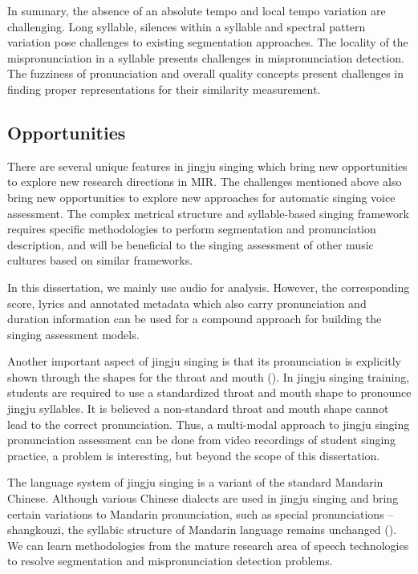 In summary, the absence of an absolute tempo and local tempo variation are challenging. Long syllable, silences within a syllable and spectral pattern variation pose challenges to existing segmentation approaches. The locality of the mispronunciation in a syllable presents challenges in mispronunciation detection. The fuzziness of pronunciation and overall quality concepts present challenges in finding proper representations for their similarity measurement.

\subsection{Opportunities}

There are several unique features in jingju singing which bring new opportunities to explore new research directions in \gls{MIR}. The challenges mentioned above also bring new opportunities to explore new approaches for automatic singing voice assessment. The complex metrical structure and syllable-based singing framework requires specific methodologies to perform segmentation and pronunciation description, and will be beneficial to the singing assessment of other music cultures based on similar frameworks.

In this dissertation, we mainly use audio for analysis. However, the corresponding score, lyrics and annotated metadata which also carry pronunciation and duration information can be used for a compound approach for building the singing assessment models.

Another important aspect of jingju singing is that its pronunciation is explicitly shown through the shapes for the throat and mouth (). In jingju singing training, students are required to use a standardized throat and mouth shape to pronounce jingju syllables. It is believed a non-standard throat and mouth shape cannot lead to the correct pronunciation. Thus, a multi-modal approach to jingju singing pronunciation assessment can be done from video recordings of student singing practice, a problem is interesting, but beyond the scope of this dissertation.

The language system of jingju singing is a variant of the standard Mandarin Chinese. Although various Chinese dialects are used in jingju singing and bring certain variations to Mandarin pronunciation, such as special pronunciations -- \gls{shangkouzi}, the syllabic structure of Mandarin language remains unchanged (). We can learn methodologies from the mature research area of speech technologies to resolve segmentation and mispronunciation detection problems. 

